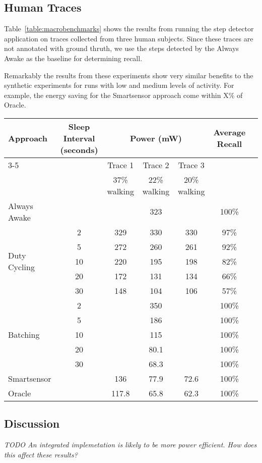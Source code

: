 \subsection{Human Traces}

Table~\ref{table:macrobenchmarks} shows the results from running the
step detector application on traces collected from three human
subjects.  Since these traces are not annotated with ground thruth, we
use the steps detected by the Always Awake as the baseline for
determining recall.

Remarkably the results from these experiments show very similar
benefits to the synthetic experiments for runs with low and medium
levels of activity.  For example, the energy saving for the
Smartsensor approach come within X\% of Oracle.


\begin{table*}[t]
\centering
{\small
    \begin{tabular}{|l|c|c|c|c|c|c|}
    \hline
	\multirow{2}{*}{Approach}		& \multirow{2}{*}{\parbox{2.2cm}{Sleep Interval (seconds)}}
												& \multicolumn{3}{c|}{\parbox{3.2cm}{Power (mW)}}
																								& \multirow{2}{*}{\parbox{1.5cm}{Average Recall}} \\ \cline{3-5}
									&			& Trace 1		& Trace 2		& Trace 3 		& 							\\ 
									&			& 37\% walking	& 22\% walking		& 20\% walking		& \\ \hline
	Always Awake					& 			& \multicolumn{3}{c|}{323} 						& 100\% \\ \hline
	\multirow{5}{*}{Duty Cycling}	& 2			& 329			& 330			& 330			& 97\%	\\ \cline{2-6}
									& 5			& 272			& 260			& 261			& 92\%	\\ \cline{2-6}
									& 10		& 220			& 195			& 198			& 82\%	\\ \cline{2-6}
									& 20		& 172			& 131			& 134			& 66\%	\\ \cline{2-6}
									& 30		& 148			& 104			& 106			& 57\%	\\ \hline
	\multirow{5}{*}{Batching}		& 2			& \multicolumn{3}{c|}{350} 						& 100\% \\ \cline{2-6}
									& 5			& \multicolumn{3}{c|}{186} 						& 100\% \\ \cline{2-6}
	 								& 10		& \multicolumn{3}{c|}{115} 						& 100\% \\ \cline{2-6}
	 								& 20		& \multicolumn{3}{c|}{80.1} 					& 100\% \\ \cline{2-6}
	 								& 30		& \multicolumn{3}{c|}{68.3} 					& 100\% \\ \hline
	Smartsensor				&			& 136			& 77.9			& 72.6			& 100\% \\ \hline
	Oracle				&			& 117.8			& 65.8			& 62.3			& 100\% \\ \hline



    \end{tabular}
}
	\caption{Event recall and power consumption for human traces.}
	\label{table:macrobenchmarks}
\end{table*}

\subsection{Discussion}

{\em TODO An integrated implemetation is likely to be more power
  efficient. How does this affect these results?}
